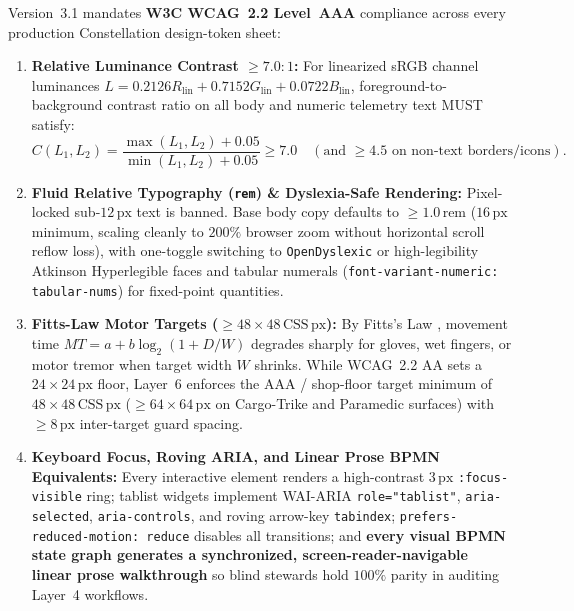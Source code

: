 Version~3.1 mandates \textbf{W3C WCAG~2.2 Level~AAA} compliance \parencite{w3c2023wcag} across every production Constellation design-token sheet:
\begin{enumerate}
    \item \textbf{Relative Luminance Contrast $\ge 7.0 : 1$:} For linearized sRGB channel luminances $L = 0.2126 R_{\mathrm{lin}} + 0.7152 G_{\mathrm{lin}} + 0.0722 B_{\mathrm{lin}}$, foreground-to-background contrast ratio on all body and numeric telemetry text MUST satisfy:
    \begin{equation}
        C(L_1, L_2) = \frac{\max(L_1, L_2) + 0.05}{\min(L_1, L_2) + 0.05} \ge 7.0 \quad (\text{and } \ge 4.5 \text{ on non-text borders/icons}).
    \end{equation}
    \item \textbf{Fluid Relative Typography (\texttt{rem}) \& Dyslexia-Safe Rendering:} Pixel-locked sub-$12\,\mathrm{px}$ text is banned. Base body copy defaults to $\ge 1.0\,\mathrm{rem}$ ($16\,\mathrm{px}$ minimum, scaling cleanly to $200\%$ browser zoom without horizontal scroll reflow loss), with one-toggle switching to \texttt{OpenDyslexic} or high-legibility Atkinson Hyperlegible faces and tabular numerals (\texttt{font-variant-numeric: tabular-nums}) for fixed-point quantities.
    \item \textbf{Fitts-Law Motor Targets ($\ge 48 \times 48\,\mathrm{CSS\,px}$):} By Fitts's Law \parencite{fitts1954information}, movement time $MT = a + b \log_2(1 + D/W)$ degrades sharply for gloves, wet fingers, or motor tremor when target width $W$ shrinks. While WCAG~2.2 AA sets a $24 \times 24\,\mathrm{px}$ floor, Layer~6 enforces the AAA / shop-floor target minimum of \textbf{$48 \times 48\,\mathrm{CSS\,px}$} ($\ge 64 \times 64\,\mathrm{px}$ on Cargo-Trike and Paramedic surfaces) with $\ge 8\,\mathrm{px}$ inter-target guard spacing.
    \item \textbf{Keyboard Focus, Roving ARIA, and Linear Prose BPMN Equivalents:} Every interactive element renders a high-contrast $3\,\mathrm{px}$ \texttt{:focus-visible} ring; tablist widgets implement WAI-ARIA \texttt{role="tablist"}, \texttt{aria-selected}, \texttt{aria-controls}, and roving arrow-key \texttt{tabindex}; \texttt{prefers-reduced-motion: reduce} disables all transitions; and \textbf{every visual BPMN state graph generates a synchronized, screen-reader-navigable linear prose walkthrough} so blind stewards hold $100\%$ parity in auditing Layer~4 workflows.
\end{enumerate}

